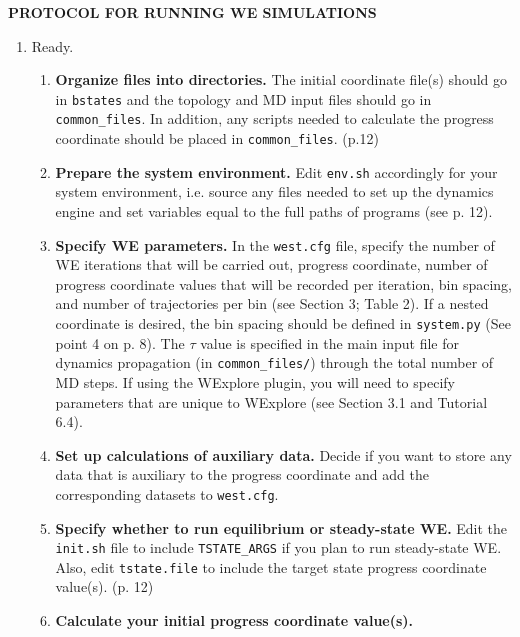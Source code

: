 \documentclass[9pt,tutorial,ASAPversion]{livecoms}
\begin{document}
\newpage
\onecolumn
\begin{center}
\begin{LARGE}
    \textbf{PROTOCOL FOR RUNNING WE SIMULATIONS}
\end{LARGE}
\end{center}
\renewcommand{\theenumi}{\Roman{enumi}}
\renewcommand{\labelenumi}{\theenumi}
\renewcommand{\theenumii}{\arabic{enumii}}
\renewcommand{\labelenumii}{(\theenumii)}
\begin{enumerate}
\item Ready.
\begin{enumerate}
\item \textbf{Organize files into directories.} 
The initial coordinate file(s) should go in \verb|bstates| and the topology and MD input files should go in \verb|common_files|. 
In addition, any scripts needed to calculate the progress coordinate should be placed in \verb|common_files|. (p.12)
\item \textbf{Prepare the system environment.}  
Edit \verb|env.sh| accordingly for your system environment, i.e. source any files needed to set up the dynamics engine and set variables equal to the full paths of programs (see p. 12). 
\item \textbf{Specify WE parameters.}  
In the \verb|west.cfg| file, specify the number of WE iterations that will be carried out, progress coordinate, number of progress coordinate values that will be recorded per iteration, bin spacing, and number of trajectories per bin (see Section 3; Table 2).  
If a nested coordinate is desired, the bin spacing should be defined in \verb|system.py| (See point 4 on p. 8).  
The $\tau$ value is specified in the main input file for dynamics propagation (in \verb|common_files/|) through the total number of MD steps.  
If using the WExplore plugin, you will need to specify parameters that are unique to WExplore (see Section 3.1 and Tutorial 6.4).
\item \textbf{Set up calculations of auxiliary data.} 
Decide if you want to store any data that is auxiliary to the progress coordinate and add the corresponding datasets to \verb|west.cfg|.
\item \textbf{Specify whether to run equilibrium or steady-state WE.}
Edit the \verb|init.sh| file to include \verb|TSTATE_ARGS| if you plan to run steady-state WE.  
Also, edit \verb|tstate.file| to include the target state progress coordinate value(s). (p. 12) 
\item \textbf{Calculate your initial progress coordinate value(s).}

\end{enumerate}
\end{enumerate}
\end{document}
